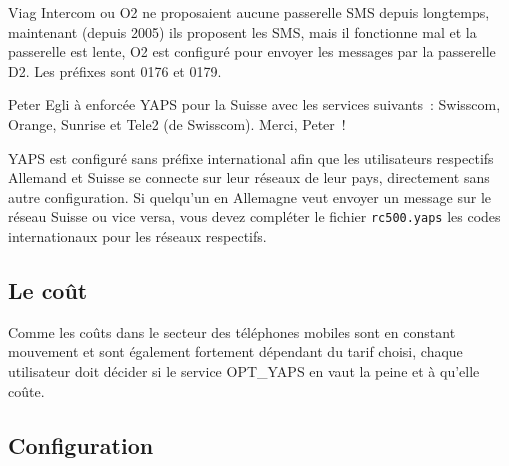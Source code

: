 Viag Intercom ou O2 ne proposaient aucune passerelle SMS depuis longtemps,
maintenant (depuis 2005) ils proposent les SMS, mais il fonctionne mal et
la passerelle est lente, O2 est configuré pour envoyer les messages par
la passerelle D2. Les préfixes sont 0176 et 0179.

Peter Egli à enforcée YAPS pour la Suisse avec les services suivants~:
Swisscom, Orange, Sunrise et Tele2 (de Swisscom). Merci, Peter~!

YAPS est configuré sans préfixe international afin que les utilisateurs
respectifs Allemand et Suisse se connecte sur leur réseaux de leur pays,
directement sans autre configuration. Si quelqu'un en Allemagne veut
envoyer un message sur le réseau Suisse ou vice versa, vous devez compléter
le fichier \texttt{rc500.yaps} les codes internationaux pour les réseaux
respectifs.

\subsection {Le coût}

Comme les coûts dans le secteur des téléphones mobiles sont en constant mouvement
et sont également fortement dépendant du tarif choisi, chaque utilisateur doit
décider si le service OPT\_YAPS en vaut la peine et à qu'elle coûte.



\subsection {Configuration}

